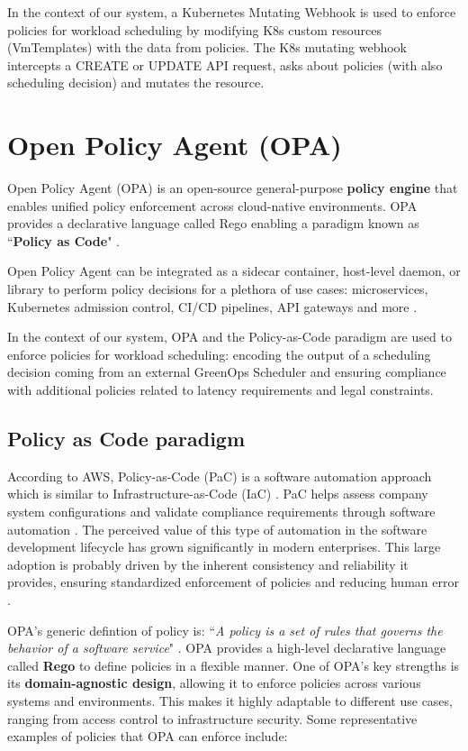 In the context of our system, a Kubernetes Mutating Webhook is used to enforce policies for workload scheduling by modifying K8s custom resources (VmTemplates) with the data from policies. 
The K8s mutating webhook intercepts a CREATE or UPDATE API request, asks about policies (with also scheduling decision) and mutates the resource.

\section{Open Policy Agent (OPA)}

Open Policy Agent (OPA) is an open-source general-purpose \textbf{policy engine} that enables unified policy enforcement across cloud-native environments. OPA provides a declarative language called Rego enabling a paradigm known as ``\textbf{Policy as Code}" \cite{opa_docs}.

Open Policy Agent can be integrated as a sidecar container, host-level daemon, or library to perform policy decisions for a plethora of use cases: microservices, Kubernetes admission control, CI/CD pipelines, API gateways and more \cite{opa_docs}. 

In the context of our system, OPA and the Policy-as-Code paradigm are used to enforce policies for workload scheduling: encoding the output of a scheduling decision coming from an external GreenOps Scheduler and ensuring compliance with additional policies related to latency requirements and legal constraints.

\subsection{Policy as Code paradigm}

According to AWS, Policy-as-Code (PaC) is a software automation approach which is similar to Infrastructure-as-Code (IaC) \cite{pac_aws}. PaC helps assess company system configurations and validate compliance requirements through software automation \cite{pac_aws}. The perceived value of this type of automation in the software development lifecycle has grown significantly in modern enterprises. This large adoption is probably driven by the inherent consistency and reliability it provides, ensuring standardized enforcement of policies and reducing human error \cite{pac_aws}.

OPA's generic defintion of policy is: ``\textit{A policy is a set of rules that governs the behavior of a software service}" \cite{opa_philosophy}. OPA provides a high-level declarative language called \textbf{Rego} to define policies in a flexible manner. One of OPA's key strengths is its \textbf{domain-agnostic design}, allowing it to enforce policies across various systems and environments. This makes it highly adaptable to different use cases, ranging from access control to infrastructure security. Some representative examples of policies that OPA can enforce include:

